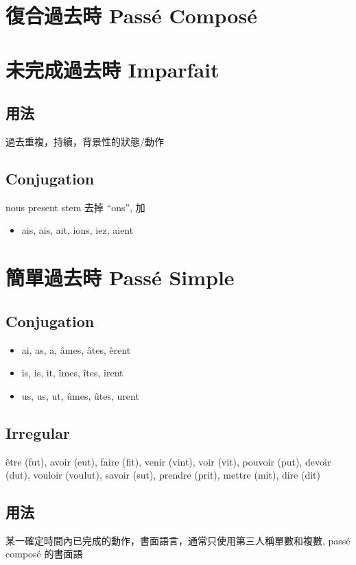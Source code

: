 \documentclass{book}
\begin{document}
    \section{復合過去時 Passé Composé}

    \section{未完成過去時 Imparfait}

        \subsection{用法}
            過去重複，持續，背景性的狀態/動作

        \subsection{Conjugation}
            nous present stem 去掉 ``ons'', 加
            \begin{itemize}
                \item ais, ais, ait, ions, iez, aient
            \end{itemize}

    \section{簡單過去時 Passé Simple}
        
        \subsection{Conjugation}
            \begin{itemize}
                \item ai, as, a, âmes, âtes, èrent
                \item is, is, it, îmes, îtes, irent
                \item us, us, ut, ûmes, ûtes, urent
            \end{itemize}

        \subsection{Irregular}
            être (fut), avoir (eut), faire (fit), venir (vint), voir (vit), pouvoir (put), devoir (dut), vouloir (voulut), savoir (sut), prendre (prit), mettre (mit), dire (dit)
        
        \subsection{用法}
            某一確定時間內已完成的動作，書面語言，通常只使用第三人稱單數和複數, passé composé 的書面語
        
\end{document}
